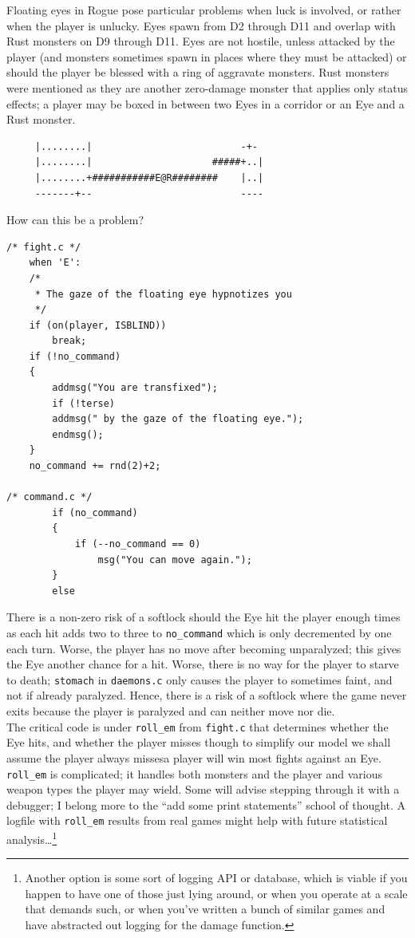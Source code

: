 \documentclass[12pt,a4paper]{article}
\begin{document}
Floating eyes in Rogue pose particular problems when luck is involved,
or rather when the player is unlucky. Eyes spawn from D2 through D11 and
overlap with Rust monsters on D9 through D11. Eyes are not hostile,
unless attacked by the player (and monsters sometimes spawn in places
where they must be attacked) or should the player be blessed with a ring
of aggravate monsters. Rust monsters were mentioned as they are another
zero-damage monster that applies only status effects; a player may be
boxed in between two Eyes in a corridor or an Eye and a Rust monster.

\begin{verbatim}
     |........|                          -+-
     |........|                     #####+..|
     |........+###########E@R########    |..|
     -------+--                          ----
\end{verbatim}

How can this be a problem?

\begin{verbatim}
/* fight.c */
    when 'E':
	/*
	 * The gaze of the floating eye hypnotizes you
	 */
	if (on(player, ISBLIND))
	    break;
	if (!no_command)
	{
	    addmsg("You are transfixed");
	    if (!terse)
		addmsg(" by the gaze of the floating eye.");
	    endmsg();
	}
	no_command += rnd(2)+2;

/* command.c */
        if (no_command)
        {
            if (--no_command == 0)
                msg("You can move again.");
        }
        else
\end{verbatim}

There is a non-zero risk of a softlock should the Eye hit the player
enough times as each hit adds two to three to \texttt{no\_command} which
is only decremented by one each turn. Worse, the player has no move
after becoming unparalyzed; this gives the Eye another chance for a hit.
Worse, there is no way for the player to starve to death;
\texttt{stomach} in \texttt{daemons.c} only causes the player to
sometimes faint, and not if already paralyzed. Hence, there is a risk of
a softlock where the game never exits because the player is paralyzed
and can neither move nor die. \\

The critical code is under \texttt{roll\_em} from \texttt{fight.c} that
determines whether the Eye hits, and whether the player misses though to
simplify our model we shall assume the player always misses\textendash a
player will win most fights against an Eye. \texttt{roll\_em} is
complicated; it handles both monsters and the player and various weapon
types the player may wield. Some will advise stepping through it with a
debugger; I belong more to the ``add some print statements'' school of
thought. A logfile with \texttt{roll\_em} results from real games might
help with future statistical analysis\ldots\footnote{Another option is
some sort of logging API or database, which is viable if you happen to
have one of those just lying around, or when you operate at a scale that
demands such, or when you've written a bunch of similar games and
have abstracted out logging for the damage function.}
\end{document}
